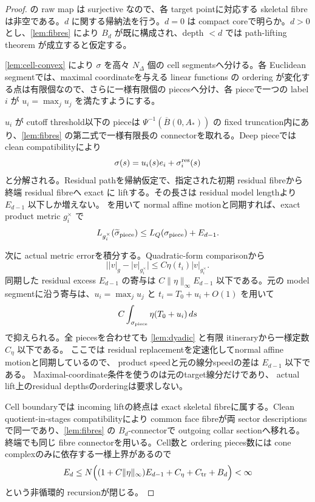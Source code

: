 \documentclass[11pt,a4paper]{ltjsarticle}
\newcommand{\ov}{\overline}
\newcommand{\wt}{\widetilde}
\theoremstyle{plain}
\theoremstyle{definition}
\theoremstyle{remark}
\begin{document}
\begin{proof}
 の raw map は surjective なので、各 target pointに対応する skeletal fibre は非空である。$d$ に関する帰納法を行う。$d=0$ は compact coreで明らか。$d>0$ とし、\cref{lem:fibres} により $B_d$ が既に構成され、depth $<d$ では path-lifting theorem が成立すると仮定する。

\cref{lem:cell-convex} により $\sigma$ を高々 $N_\Delta$ 個の cell segmentsへ分ける。各 Euclidean segmentでは、maximal coordinateを与える linear functions の ordering が変化する点は有限個なので、さらに一様有限個の piecesへ分け、各 pieceで一つの label $i$ が $u_i=\max_j u_j$ を満たすようにする。

$u_i$ が cutoff threshold以下の pieceは $\Psi^{-1}(\ov B(0,A_*))$ の fixed truncation内にあり、\cref{lem:fibres} の第二式で一様有限長の connectorを取れる。Deep pieceでは clean compatibilityにより
\[
 \sigma(s)=u_i(s)e_i+\sigma_i^{\rm res}(s)
\]
と分解される。Residual pathを帰納仮定で、指定された初期 residual fibreから終端 residual fibreへ exact に liftする。その長さは residual model lengthより $E_{d-1}$ 以下しか増えない。 を用いて normal affine motionと同期すれば、exact product metric $g_i^\times$ で
\[
 L_{g_i^\times}(\wt\sigma_{\rm piece})
 \le L_{Q}(\sigma_{\rm piece})+E_{d-1}.
\]

次に actual metric errorを積分する。Quadratic-form comparisonから
\[
 \bigl||v|_g-|v|_{g_i^\times}\bigr|
 \le C\eta(t_i)|v|_{g_i^\times}.
\]
同期した residual excess $E_{d-1}$ の寄与は $C\|\eta\|_\infty E_{d-1}$ 以下である。元の model segmentに沿う寄与は、$u_i=\max_j u_j$ と $t_i=T_0+u_i+O(1)$ を用いて
\[
 C\int_{\sigma_{\rm piece}}\eta(T_0+u_i)\,ds
\]
で抑えられる。全 piecesを合わせても \cref{lem:dyadic} と有限 itineraryから一様定数 $C_\eta$ 以下である。
ここでは residual replacementを定速化してnormal affine motionと同期しているので、
product speedと元の線分speedの差は $E_{d-1}$ 以下である。
Maximal-coordinate条件を使うのは元のtarget線分だけであり、
actual lift上のresidual depthsのorderingは要求しない。

Cell boundaryでは incoming liftの終点は exact skeletal fibreに属する。Clean quotient-in-stages compatibilityにより common face fibreが両 sector descriptionsで同一であり、\cref{lem:fibres} の $B_d$-connectorで outgoing collar sectionへ移れる。終端でも同じ fibre connectorを用いる。Cell数と ordering pieces数には cone complexのみに依存する一様上界があるので
\[
 E_d\le N\Bigl((1+C\|\eta\|_\infty)E_{d-1}
      +C_\eta+C_{\rm tr}+B_d\Bigr)<\infty
\]
という非循環的 recursionが閉じる。
\end{proof}
\end{document}
